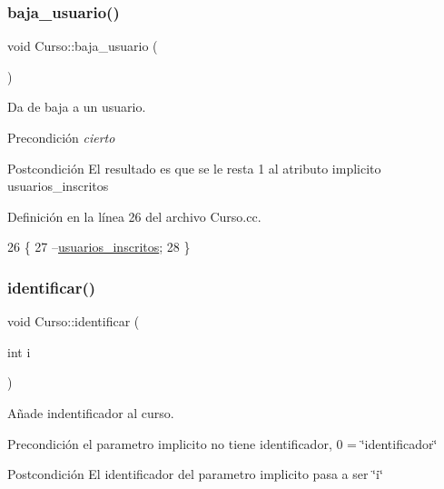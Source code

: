 \subsubsection{\texorpdfstring{baja\+\_\+usuario()}{baja\_usuario()}}
{\footnotesize\ttfamily void Curso\+::baja\+\_\+usuario (\begin{DoxyParamCaption}{ }\end{DoxyParamCaption})}



Da de baja a un usuario. 

\begin{DoxyPrecond}{Precondición}
{\itshape cierto} 
\end{DoxyPrecond}
\begin{DoxyPostcond}{Postcondición}
El resultado es que se le resta 1 al atributo implicito usuarios\+\_\+inscritos 
\end{DoxyPostcond}


Definición en la línea 26 del archivo Curso.\+cc.


\begin{DoxyCode}
26                          \{
27   --\mbox{\hyperlink{class_curso_a94c41191b9cd9dc8af95e7d2560a2381}{usuarios\_inscritos}};
28 \}
\end{DoxyCode}
\mbox{\label{class_curso_a88963d0571e8633bf77f7508e02a031b}} 
\subsubsection{\texorpdfstring{identificar()}{identificar()}}
{\footnotesize\ttfamily void Curso\+::identificar (\begin{DoxyParamCaption}\item[{int}]{i }\end{DoxyParamCaption})}



Añade indentificador al curso. 

\begin{DoxyPrecond}{Precondición}
el parametro implicito no tiene identificador, 0 = \char`\"{}identificador\char`\"{} 
\end{DoxyPrecond}
\begin{DoxyPostcond}{Postcondición}
El identificador del parametro implicito pasa a ser \char`\"{}i\char`\"{} 
\end{DoxyPostcond}


